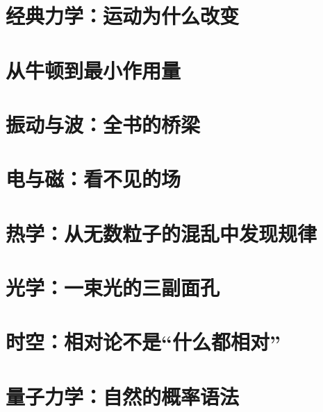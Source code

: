 \documentclass[fontset=fandol,12pt,openany]{ctexbook}
\begin{document}
\part{经典力学：运动为什么改变}








\part{从牛顿到最小作用量}



\part{振动与波：全书的桥梁}



\part{电与磁：看不见的场}







\part{热学：从无数粒子的混乱中发现规律}







\part{光学：一束光的三副面孔}





\part{时空：相对论不是“什么都相对”}




\part{量子力学：自然的概率语法}









\end{document}
